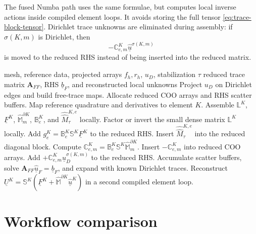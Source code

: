 \documentclass[11pt]{article}
\newcommand{\T}{\mathcal T_h}
\newcommand{\uhat}{\underline{\widehat u}}
\newcommand{\UK}{\underline U^K}
\newcommand{\FK}{\underline F^K}
\newcommand{\LK}{\mathbb L^K}
\newcommand{\SK}{\mathbb S^K}
\newcommand{\B}{\mathbb B}
\newcommand{\C}{\mathbb C}
\newcommand{\Mbb}{\widehat{\mathbb M}}
\newcommand{\Mhh}{\widehat{\widehat M}}
\begin{document}
The fused Numba path uses the same formulae, but computes local inverse actions inside compiled element loops. It avoids storing the full tensor \eqref{eq:trace-block-tensor}. Dirichlet trace unknowns are eliminated during assembly: if $\sigma(K,m)$ is Dirichlet, then
\[
    -\C_{e,m}^K\uhat^{\sigma(K,m)}
\]
is moved to the reduced RHS instead of being inserted into the reduced matrix.

\begin{algorithm}[p]
\caption{Fused Numba reduced trace assembly}
\footnotesize
\begin{algorithmic}[1]
\Require mesh, reference data, projected arrays $f_h,r_h$, $u_D$, stabilization $\tau$
\Ensure reduced trace matrix $\mathbf A_{FF}$, RHS $\underline b_F$, and reconstructed local unknowns
\State Project $u_D$ on Dirichlet edges and build free-trace maps.
\State Allocate reduced COO arrays and RHS scatter buffers.
\ForAll{$K\in\T$}
    \State Map reference quadrature and derivatives to element $K$.
    \State Assemble $\LK$, $\FK$, $\Mbb_m^{\partial K}$, $\B_e^K$, and $\Mhh_\tau^{K,e}$ locally.
    \State Factor or invert the small dense matrix $\LK$ locally.
        \State Add $g_e^K=\B_e^K\SK\FK$ to the reduced RHS.
        \State Insert $\Mhh_\tau^{K,e}$ into the reduced diagonal block.
            \State Compute $\C_{e,m}^K=\B_e^K\SK\Mbb_m^{\partial K}$.
                \State Insert $-\C_{e,m}^K$ into reduced COO arrays.
            \Else
                \State Add $+\C_{e,m}^K\uhat_D^{\sigma(K,m)}$ to the reduced RHS.
            \EndIf
        \EndFor
    \EndFor
\EndFor
\State Accumulate scatter buffers, solve $\mathbf A_{FF}\uhat_F=\underline b_F$, and expand with known Dirichlet traces.
\State Reconstruct $\UK=\SK(\FK+\Mbb^{\partial K}\uhat^K)$ in a second compiled element loop.
\end{algorithmic}
\end{algorithm}

\section{Workflow comparison}
\end{document}
